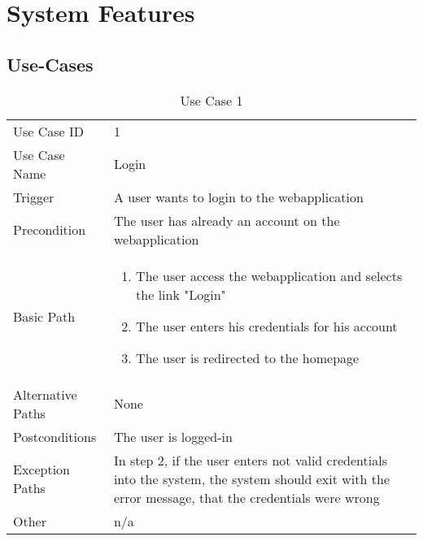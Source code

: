 \section{System Features}

\subsection{Use-Cases}

\begin{table}[H]
\centering
\label{table-use-case-1}
\begin{tabular}{|p{3cm}|p{10cm}}
Use Case ID       & 1                                                                                                                                                              \\
Use Case Name     & Login                                                                                                                                                          \\
Trigger           & A user wants to login to the webapplication                                                                                                                   \\
Precondition      & The user has already an account on the webapplication                                                                                                          \\
Basic Path        & \begin{enumerate}
\item The user access the webapplication and selects the link "Login"
\item The user enters his credentials for his account
\item The user is redirected to the homepage
\end{enumerate} 
     \\
Alternative Paths & None                          \\
Postconditions    & The user is logged-in                                                                                                                                          \\
Exception Paths   & In step 2, if the user enters not valid credentials into the system, the system should exit with the error message, that the credentials were wrong            \\
Other             & n/a                                                                                                                                                                                                        
\end{tabular}
\caption{Use Case 1}
\end{table}

